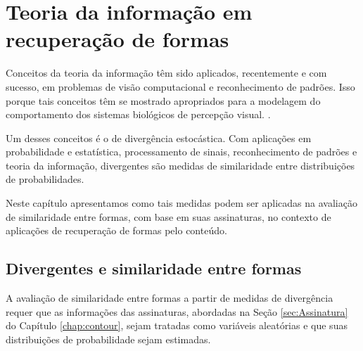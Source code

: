 \chapter{Teoria da informação em recuperação de formas}


Conceitos da teoria da informação têm sido aplicados, recentemente e com sucesso,  em problemas de visão computacional e reconhecimento de padrões. Isso porque tais conceitos têm se mostrado apropriados para a modelagem do comportamento dos sistemas biológicos de percepção visual. \cite{Escolano:2009}. 

Um desses conceitos é o de divergência estocástica. Com aplicações em probabilidade e estatística, processamento de sinais, reconhecimento de padrões e teoria da informação,  divergentes são medidas de similaridade entre distribuições de probabilidades. 

\begin{comment}
From Sample Similarity to Ensemble
Similarity: Probabilistic Distance Measures
in Reproducing Kernel Hilbert Space


Probabilistic distance measures find use in many research
areas such as probability and statistics, pattern recognition,
information theory, communication, and so on. In statistics,
the probabilistic distances are often used in asymptotic
analysis. In pattern recognition, pattern separability is
usually evaluated using probabilistic distance measures [1],
[2] such as Chernoff or Bhattacharyya distances because they
provide bounds for the probability of error. 
\end{comment}

Neste capítulo apresentamos como tais medidas podem ser aplicadas na avaliação de similaridade entre formas, com base em suas assinaturas, no contexto de aplicações de recuperação de formas pelo conteúdo.

\section{Divergentes e similaridade entre formas}

A avaliação de similaridade entre formas a partir de medidas de divergência requer que as informações das assinaturas, abordadas na Seção \ref{sec:Assinatura} do Capítulo \ref{chap:contour}, sejam tratadas como variáveis aleatórias e que suas distribuições de probabilidade sejam estimadas. 

